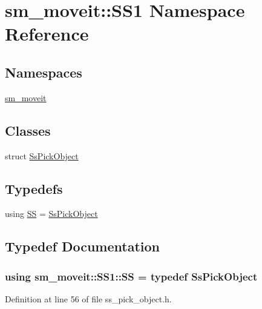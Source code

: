 \hypertarget{namespacesm__moveit_1_1SS1}{}\section{sm\+\_\+moveit\+:\+:S\+S1 Namespace Reference}
\label{namespacesm__moveit_1_1SS1}
\subsection*{Namespaces}
\begin{DoxyCompactItemize}
\item 
 \hyperlink{namespacesm__moveit_1_1SS1_1_1sm__moveit}{sm\+\_\+moveit}
\end{DoxyCompactItemize}
\subsection*{Classes}
\begin{DoxyCompactItemize}
\item 
struct \hyperlink{structsm__moveit_1_1SS1_1_1SsPickObject}{Ss\+Pick\+Object}
\end{DoxyCompactItemize}
\subsection*{Typedefs}
\begin{DoxyCompactItemize}
\item 
using \hyperlink{namespacesm__moveit_1_1SS1_a82919e558782e44b5fbfed9a58db5203}{SS} = \hyperlink{structsm__moveit_1_1SS1_1_1SsPickObject}{Ss\+Pick\+Object}
\end{DoxyCompactItemize}


\subsection{Typedef Documentation}
\subsubsection[{\texorpdfstring{SS}{SS}}]{\setlength{\rightskip}{0pt plus 5cm}using {\bf sm\+\_\+moveit\+::\+S\+S1\+::\+SS} = typedef {\bf Ss\+Pick\+Object}}\hypertarget{namespacesm__moveit_1_1SS1_a82919e558782e44b5fbfed9a58db5203}{}\label{namespacesm__moveit_1_1SS1_a82919e558782e44b5fbfed9a58db5203}


Definition at line 56 of file ss\+\_\+pick\+\_\+object.\+h.

